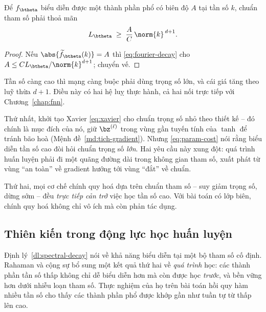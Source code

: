 \begin{hequa}
\label{hq:parameter-cost}
Để $f_{\btheta}$ biểu diễn được một thành phần phổ có biên độ $A$ tại tần số $k$,
chuẩn tham số phải thoả mãn
\begin{equation}
L_{\btheta} \;\ge\; \frac{A}{C}\,\norm{k}^{\,d+1}.
\label{eq:param-cost}
\end{equation}
\end{hequa}
 
\begin{proof}
Nếu $\abs{\widetilde f_{\btheta}(k)} = A$ thì \eqref{eq:fourier-decay} cho
$A \le C L_{\btheta}/\norm{k}^{d+1}$; chuyển vế.
\end{proof}
 
Tần số càng cao thì mạng càng buộc phải dùng trọng số lớn, và cái giá tăng theo
luỹ thừa $d+1$. Điều này có hai hệ luỵ thực hành, cả hai nối trực tiếp với
Chương~\ref{chap:fnn}.
 
Thứ nhất, khởi tạo Xavier \eqref{eq:xavier} cho chuẩn trọng số nhỏ theo
thiết kế -- đó chính là mục đích của nó, giữ $\bz^{(\ell)}$ trong vùng gần tuyến
tính của $\tanh$ để tránh bão hoà (Mệnh đề~\ref{md:tich-gradient}). Nhưng
\eqref{eq:param-cost} nói rằng biểu diễn tần số cao đòi hỏi chuẩn trọng số
\emph{lớn}. Hai yêu cầu này xung đột: quá trình huấn luyện phải đi một quãng
đường dài trong không gian tham số, xuất phát từ vùng ``an toàn'' về gradient
hướng tới vùng ``đắt'' về chuẩn.
 
Thứ hai, mọi cơ chế chính quy hoá dựa trên chuẩn tham số -- suy giảm trọng số,
dừng sớm -- đều \emph{trực tiếp cản trở} việc học tần số cao. Với bài toán có lớp
biên, chính quy hoá không chỉ vô ích mà còn phản tác dụng.
 
\subsection{Thiên kiến trong động lực học huấn luyện}
\label{subsec:dong-luc-hoc}
 
Định lý~\ref{dl:spectral-decay} nói về khả năng biểu diễn tại một bộ tham số cố
định. Rahaman và cộng sự bổ sung một kết quả thứ hai về \emph{quá trình} học: các
thành phần tần số thấp không chỉ dễ biểu diễn hơn mà còn được học \emph{trước},
và bền vững hơn dưới nhiễu loạn tham số. Thực nghiệm của họ trên bài toán hồi quy
hàm nhiều tần số cho thấy các thành phần phổ được khớp gần như tuần tự từ thấp
lên cao.
 
